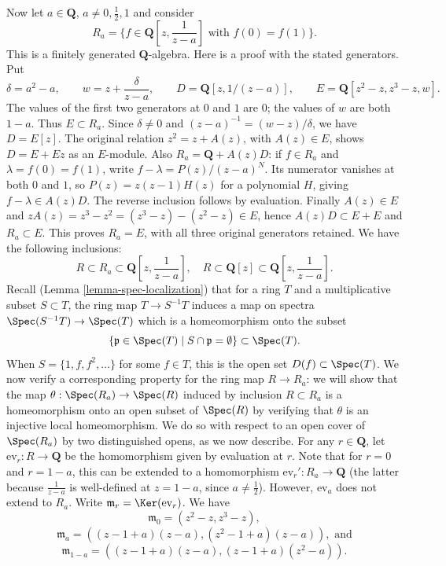 \begin{example}
\medskip\noindent
Now let $a \in \mathbf{Q}$, $a \neq 0, \frac{1}{2}, 1$ and
consider
$$
R_a = \{ f \in \mathbf{Q}[z, \frac{1}{z-a}]\text{ with }f(0) = f(1)
\}.
$$
This is a finitely generated $\mathbf Q$-algebra. Here is a proof
with the stated generators. Put
$$
\delta=a^2-a,\qquad
w=z+\frac{\delta}{z-a},\qquad
D=\mathbf Q[z,1/(z-a)],\qquad
E=\mathbf Q[z^2-z,z^3-z,w].
$$
The values of the first two generators at $0$ and $1$ are $0$;
the values of $w$ are both $1-a$. Thus $E\subset R_a$.
Since $\delta\ne0$ and $(z-a)^{-1}=(w-z)/\delta$, we have
$D=E[z]$. The original relation $z^2=z+A(z)$, with $A(z)\in E$,
shows $D=E+Ez$ as an $E$-module.
Also $R_a=\mathbf Q+A(z)D$: if $f\in R_a$ and
$\lambda=f(0)=f(1)$, write $f-\lambda=P(z)/(z-a)^N$.
Its numerator vanishes at both $0$ and $1$, so $P(z)=z(z-1)H(z)$
for a polynomial $H$, giving $f-\lambda\in A(z)D$.
The reverse inclusion follows by evaluation.
Finally $A(z)\in E$ and
$zA(z)=z^3-z^2=(z^3-z)-(z^2-z)\in E$, hence
$A(z)D\subset E+E$ and $R_a\subset E$.
This proves $R_a=E$, with all three original generators retained.
We have the following inclusions:
$$
R\subset R_a\subset\mathbf{Q}[z, \frac{1}{z-a}], \quad
R\subset\mathbf{Q}[z]\subset\mathbf{Q}[z, \frac{1}{z-a}].
$$
Recall (Lemma \ref{lemma-spec-localization}) that for a ring $T$ and a
multiplicative subset $S\subset T$, the ring map $T \to S^{-1}T$
induces a map on spectra $\Spec(S^{-1}T) \to \Spec(T)$
which is a homeomorphism onto the subset
$$
\{\mathfrak p \in \Spec(T) \mid S \cap \mathfrak p = \emptyset\}
\subset \Spec(T).
$$
When $S = \{ 1, f, f^2, \ldots\}$ for some $f\in T$, this is
the open set $D(f)\subset \Spec(T)$.  We now verify a corresponding
property for the ring map $R \to R_a$: we will show that the map
$\theta : \Spec(R_a) \to \Spec(R)$ induced by inclusion
$R\subset R_a$ is a homeomorphism onto an open subset of
$\Spec(R)$ by verifying that $\theta$ is an injective local
homeomorphism.  We do so with respect to an open cover of
$\Spec(R_a)$ by two distinguished opens, as we now describe.
For any $r\in\mathbf{Q}$, let $\text{ev}_r : R \to \mathbf{Q}$ be the
homomorphism given by evaluation at $r$.  Note that for $r = 0$ and
$r = 1-a$, this can be extended to a homomorphism
$\text{ev}_r' : R_a \to \mathbf{Q}$ (the latter because $\frac{1}{z-a}$
is well-defined at $z = 1-a$, since $a\neq\frac{1}{2}$).  However,
$\text{ev}_a$ does not extend to $R_a$.  Write
$\mathfrak{m}_r = \Ker(\text{ev}_r)$. We have
$$
\mathfrak{m}_0 = (z^2-z, z^3-z),
$$
$$
\mathfrak{m}_a = ((z-1 + a)(z-a), (z^2-1 + a)(z-a)), \text{ and}
$$
$$
\mathfrak{m}_{1-a} = ((z-1 + a)(z-a), (z-1 + a)(z^2-a)).
$$
\end{example}
